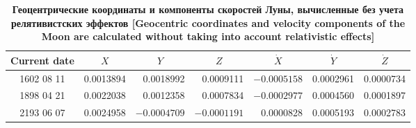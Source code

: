 \begin{table}
\begin{minipage}[t]{160mm}
\vspace{5mm}


\caption{\bf Геоцентрические координаты и компоненты скоростей Луны, вычисленные без учета релятивистских эффектов [Geocentric coordinates and velocity components of the Moon are calculated without taking into account relativistic effects]
\vspace{-3mm}}
\begin{tabular}{|c|r|r|r|r|r|r|}
\hline
\footnotesize
\rule{0mm}{12pt}%
Current date & \multicolumn{1}{c|}{\footnotesize $X$}&	\multicolumn{1}{c|}{\footnotesize $Y$}&	\multicolumn{1}{c|}{\footnotesize $Z$}&	\multicolumn{1}{c|}{\footnotesize $\dot{X}$}&	\multicolumn{1}{c|}{\footnotesize $\dot{Y}$}&	\multicolumn{1}{c|}{\footnotesize$\dot{Z}$}\\ \hline
\rule{0mm}{14pt}%
1602 08 11&	0.0013894&	0.0018992&	0.0009111&	$-0.0005158$&	0.0002961&	  0.0000734\\ \hline
1898 04 21&	0.0022038&	0.0012358&	0.0007834&	$-0.0002977$&	0.0004560&	 0.0001897\\ \hline
2193 06 07&	0.0024958&	$-0.0004709$&	$-0.0001191$&	0.0000828&	0.0005193&	 0.0002783\\ \hline
\end{tabular}
\label{table:zausaev:tabl7}
\end{minipage}
\end{table}






